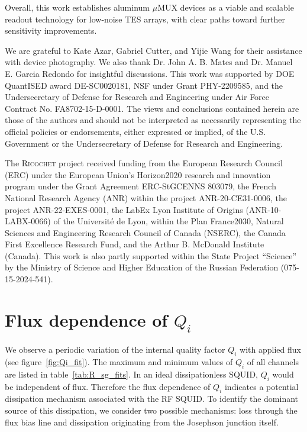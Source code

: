 \documentclass[
 prd,
 reprint,
 superscriptaddress,
 amsmath,amssymb,
 aps,
 floatfix,
]{revtex4-2}
\newcommand{\ricochet}{\textsc{Ricochet}\xspace}
\begin{document}
Overall, this work establishes aluminum $\mu$MUX devices as a viable and scalable readout technology for low-noise TES arrays, with clear paths toward further sensitivity improvements.



\begin{acknowledgments}
We are grateful to Kate Azar, Gabriel Cutter, and Yijie Wang for their assistance with device photography. We also thank Dr. John A. B. Mates and Dr. Manuel E. Garcia Redondo for insightful discussions. This work was supported by DOE QuantISED award DE-SC0020181, NSF under Grant PHY-2209585, and the Undersecretary of Defense for Research and Engineering under Air Force Contract No. FA8702-15-D-0001. The views and conclusions contained herein are those of the authors and should not be interpreted as necessarily representing the official policies or endorsements, either expressed or implied, of the U.S. Government or the Undersecretary of Defense for Research and Engineering.

The \ricochet project received funding from the European Research Council (ERC) under the European Union’s Horizon2020 research and innovation program under the Grant Agreement ERC-StGCENNS 803079, the French National Research Agency (ANR) within the project ANR-20-CE31-0006, the project ANR-22-EXES-0001, the LabEx Lyon Institute of Origins (ANR-10-LABX-0066) of the Université de Lyon, within the Plan France2030, Natural Sciences and Engineering Research Council of Canada (NSERC), the Canada First Excellence Research Fund, and the Arthur B. McDonald Institute (Canada). This work is also partly supported within the State Project “Science” by the Ministry of Science and Higher Education of the Russian Federation (075-15-2024-541).

\end{acknowledgments}

\appendix
\section{Flux dependence of $Q_i$} \label{appx:Qi}



We observe a periodic variation of the internal quality factor $Q_i$ with applied flux (see figure~\ref{fig:Qi_fit}). The maximum and minimum values of $Q_i$ of all channels are listed in table~\ref{tab:R_sg_fits}. In an ideal dissipationless SQUID, $Q_i$ would be independent of flux. Therefore the flux dependence of $Q_i$ indicates a potential dissipation mechanism associated with the RF SQUID. To identify the dominant source of this dissipation, we consider two possible mechanisms: loss through the flux bias line and dissipation originating from the Josephson junction itself.
\end{document}
